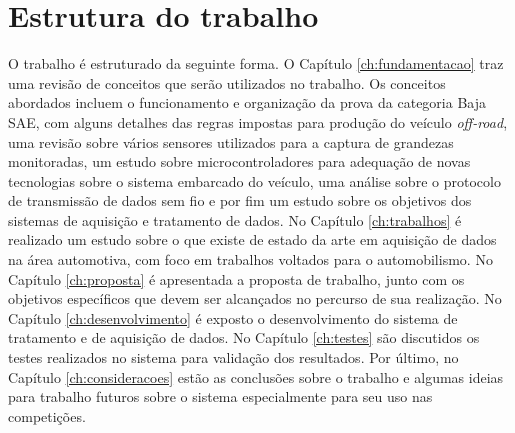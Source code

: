 \section{Estrutura do trabalho}

O trabalho é estruturado da seguinte forma. O Capítulo \ref{ch:fundamentacao} traz uma revisão de conceitos que serão utilizados no trabalho. Os conceitos abordados incluem o funcionamento e organização da prova da categoria Baja SAE, com alguns detalhes das regras impostas para produção do veículo \textit{off-road}, uma revisão sobre vários sensores utilizados para a captura de grandezas monitoradas, um estudo sobre microcontroladores para adequação de novas tecnologias sobre o sistema embarcado do veículo, uma análise sobre o protocolo de transmissão de dados sem fio e por fim um estudo sobre os objetivos dos sistemas de aquisição e tratamento de dados. No Capítulo \ref{ch:trabalhos} é realizado um estudo sobre o que existe de estado da arte em aquisição de dados na área automotiva, com foco em trabalhos voltados para o automobilismo. No Capítulo \ref{ch:proposta} é apresentada a proposta de trabalho, junto com os objetivos específicos que devem ser alcançados no percurso de sua realização. No Capítulo \ref{ch:desenvolvimento} é exposto o desenvolvimento do sistema de tratamento e de aquisição de dados. No Capítulo \ref{ch:testes} são discutidos os testes realizados no sistema para validação dos resultados. Por último, no Capítulo \ref{ch:consideracoes} estão as conclusões sobre o trabalho e algumas ideias para trabalho futuros sobre o sistema especialmente para seu uso nas competições.  

